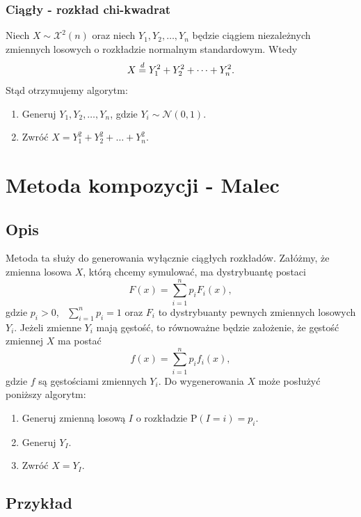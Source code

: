 \documentclass[12pt]{mwrep}
\begin{document}
	\subsubsection{Ciągły - rozkład chi-kwadrat}
	\noindent Niech $ X \sim \mathcal{X}^2(n) $ oraz niech $Y_1, Y_2, \dots, Y_n$ będzie ciągiem niezależnych zmiennych losowych o rozkładzie normalnym standardowym. Wtedy
	$$ X \buildrel{d} \over{=} Y_1^2 + Y_2^2 + \dots + Y_n^2. $$
	Stąd otrzymujemy algorytm:
	\begin{enumerate}[leftmargin=10mm]
		\item Generuj $ Y_1, Y_2, \dots, Y_n $, gdzie $Y_i \sim \mathcal{N}(0, 1) $.
		\item Zwróć $ X = Y_1^2 + Y_2^2 + \dots + Y_n^2 $.
	\end{enumerate}
	
	
	
	
	
	\section{Metoda kompozycji - Malec}
	
	\subsection{Opis}
	\noindent Metoda ta służy do generowania wyłącznie ciągłych rozkładów. Załóżmy, że zmienna losowa $X$, którą chcemy symulować, ma dystrybuantę postaci
	$$ F(x) = \sum_{i=1}^n p_i F_i(x), $$
	gdzie $p_i > 0$, \ $\sum\limits_{i=1}^n p_i = 1$ oraz $F_i$ to dystrybuanty pewnych zmiennych losowych $Y_i$. Jeżeli zmienne $Y_i$ mają gęstość, to równoważne będzie założenie, że gęstość zmiennej $X$ ma postać
	$$ f(x) = \sum_{i=1}^n p_i f_i(x), $$
	gdzie $f$ są gęstościami zmiennych $Y_i$. Do wygenerowania $X$ może posłużyć poniższy algorytm:
	\begin{enumerate}
		\item Generuj zmienną losową $I$ o rozkładzie $\mathrm{P}(I = i) = p_i$.
		\item Generuj $Y_I$.
		\item Zwróć $X = Y_I$.
	\end{enumerate}

	\subsection{Przykład}




	
\end{document}
